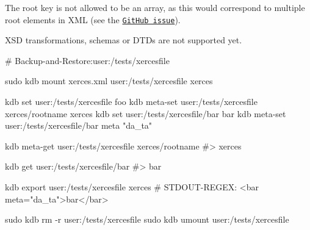 The root key is not allowed to be an array, as this would correspond to multiple root elements in X\+ML (see the \href{https://github.com/ElektraInitiative/libelektra/issues/1451}{\tt Git\+Hub issue}).

X\+SD transformations, schemas or D\+T\+Ds are not supported yet.


\begin{DoxyCode}
# Backup-and-Restore:user:/tests/xercesfile

sudo kdb mount xerces.xml user:/tests/xercesfile xerces

kdb set user:/tests/xercesfile foo
kdb meta-set user:/tests/xercesfile xerces/rootname xerces
kdb set user:/tests/xercesfile/bar bar
kdb meta-set user:/tests/xercesfile/bar meta "da\_ta"

kdb meta-get user:/tests/xercesfile xerces/rootname
#> xerces

kdb get user:/tests/xercesfile/bar
#> bar

kdb export user:/tests/xercesfile xerces
# STDOUT-REGEX: <bar meta="da\_ta">bar</bar>

sudo kdb rm -r user:/tests/xercesfile
sudo kdb umount user:/tests/xercesfile
\end{DoxyCode}
 